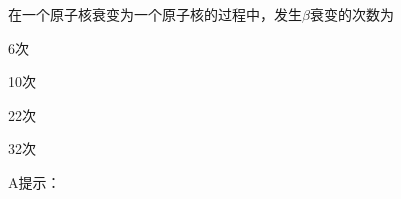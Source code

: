 在一个原子核衰变为一个原子核的过程中，发生\(\beta\)衰变的次数为\paren[]
\begin{choices}
	\item 6次
	\item 10次
	\item 22次
	\item 32次
\end{choices}
\begin{answer}
	A\qquad 提示：
\end{answer}
